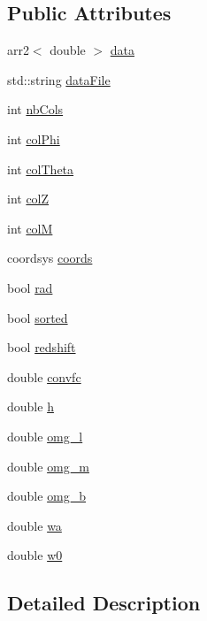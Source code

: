 \subsection*{Public Attributes}
\begin{DoxyCompactItemize}
\item 
arr2$<$ double $>$ \hyperlink{modulesurvey_ad31303c9a3c7a5001561118b97890e76}{data}
\item 
std::string \hyperlink{modulesurvey_a6dad0d753c416bddadd0fdb79fc2a6bc}{dataFile}
\item 
int \hyperlink{modulesurvey_a25e30c3a15c8da2d421a85cd18f8e6ed}{nbCols}
\item 
int \hyperlink{modulesurvey_a642ce97be4d3188b72efb912bf4f68f6}{colPhi}
\item 
int \hyperlink{modulesurvey_ada2038b3c76983d5da9c9e4b64758d98}{colTheta}
\item 
int \hyperlink{modulesurvey_a8cbaccb2ed0adf76727b20fcdde2d8d3}{colZ}
\item 
int \hyperlink{modulesurvey_a42026eb359cbe1fb070ffef2e444aecb}{colM}
\item 
coordsys \hyperlink{modulesurvey_ac98a933e4c00622128991d1b60009307}{coords}
\item 
bool \hyperlink{modulesurvey_a8f30a6ca63dd3c3abe8ed1700849b399}{rad}
\item 
bool \hyperlink{modulesurvey_a31df3e0a4afb61109790b98e8dc7cebf}{sorted}
\item 
bool \hyperlink{modulesurvey_af50a00fbd76d31c442c83c310673bc48}{redshift}
\item 
double \hyperlink{modulesurvey_a5ecdf494143dc4405d8bfa1bd8aac977}{convfc}
\item 
double \hyperlink{modulesurvey_aaf7661ce71838ee82daf689fa3376e50}{h}
\item 
double \hyperlink{modulesurvey_a0bd34c61702e99cc51bc42e60b27addb}{omg\_\-l}
\item 
double \hyperlink{modulesurvey_a80706db19f844bda5bb06fcded22c3d3}{omg\_\-m}
\item 
double \hyperlink{modulesurvey_a4125c25d288280ab388ce51932f20bb4}{omg\_\-b}
\item 
double \hyperlink{modulesurvey_a496fd2e71e2da932fb9c6f591cd98bf5}{wa}
\item 
double \hyperlink{modulesurvey_ad51507ebe1e5898954d5fb5d0b318c61}{w0}
\end{DoxyCompactItemize}


\subsection{Detailed Description}


